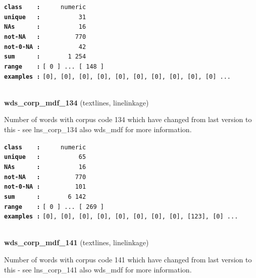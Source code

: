 \documentclass[]{article}
\begin{document}
\textbf{\texttt{class\ \ \ \ :}} \texttt{~~~~~numeric}\\
\textbf{\texttt{unique\ \ \ :}} \texttt{~~~~~~~~~~31}\\
\textbf{\texttt{NAs\ \ \ \ \ \ :}} \texttt{~~~~~~~~~~16}\\
\textbf{\texttt{not-NA\ \ \ :}} \texttt{~~~~~~~~~770}\\
\textbf{\texttt{not-0-NA\ :}} \texttt{~~~~~~~~~~42}\\
\textbf{\texttt{sum\ \ \ \ \ \ :}} \texttt{~~~~~~~1~254}\\
\textbf{\texttt{range\ \ \ \ :}}
\texttt{{[}\ 0\ {]}\ ...\ {[}\ 148\ {]}}\\
\textbf{\texttt{examples\ :}}
\texttt{{[}0{]},\ {[}0{]},\ {[}0{]},\ {[}0{]},\ {[}0{]},\ {[}0{]},\ {[}0{]},\ {[}0{]},\ {[}0{]},\ {[}0{]}\ ...}\\

~

\textbf{wds\_corp\_mdf\_134} (textlines, linelinkage)

Number of words with corpus code 134 which have changed from last
version to this - see lns\_corp\_134 also wds\_mdf for more information.

\textbf{\texttt{class\ \ \ \ :}} \texttt{~~~~~numeric}\\
\textbf{\texttt{unique\ \ \ :}} \texttt{~~~~~~~~~~65}\\
\textbf{\texttt{NAs\ \ \ \ \ \ :}} \texttt{~~~~~~~~~~16}\\
\textbf{\texttt{not-NA\ \ \ :}} \texttt{~~~~~~~~~770}\\
\textbf{\texttt{not-0-NA\ :}} \texttt{~~~~~~~~~101}\\
\textbf{\texttt{sum\ \ \ \ \ \ :}} \texttt{~~~~~~~6~142}\\
\textbf{\texttt{range\ \ \ \ :}}
\texttt{{[}\ 0\ {]}\ ...\ {[}\ 269\ {]}}\\
\textbf{\texttt{examples\ :}}
\texttt{{[}0{]},\ {[}0{]},\ {[}0{]},\ {[}0{]},\ {[}0{]},\ {[}0{]},\ {[}0{]},\ {[}0{]},\ {[}123{]},\ {[}0{]}\ ...}\\

~

\textbf{wds\_corp\_mdf\_141} (textlines, linelinkage)

Number of words with corpus code 141 which have changed from last
version to this - see lns\_corp\_141 also wds\_mdf for more information.
\end{document}
